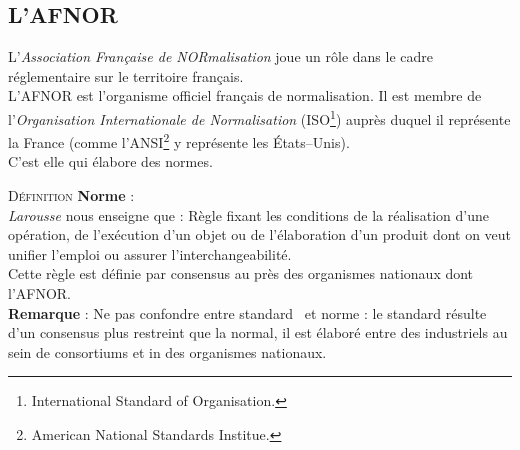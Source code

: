 \documentclass[a4paper,11pt]{article}
\newcounter{defi}
\newcommand{\defi}[1]{\addtocounter{defi}{1}%
  \noindent\textsc{Définition \thedefi } \textbf{#1} :\\ }
\newcommand{\rem}{\noindent\textbf{Remarque} : }
\begin{document}
\begin{sloppypar}
\subsection{L'AFNOR}
L'\emph{Association Française de NORmalisation} joue un rôle dans le cadre réglementaire sur le territoire français.\\
L'AFNOR est l'organisme officiel français de normalisation. Il est membre de l'\emph{Organisation Internationale de Normalisation} 
(ISO\footnote{International Standard of Organisation.}) auprès duquel il représente la France (comme l'ANSI\footnote{American National Standards Institue.} y représente les \'Etats--Unis).\\
C'est elle qui élabore des normes.\\

\defi{Norme}
\emph{Larousse} nous enseigne que : Règle fixant les conditions de la réalisation d'une opération, de l'exécution d'un objet ou de 
l'élaboration d'un produit dont on veut unifier l'emploi ou assurer l'interchangeabilité.\\
Cette règle est définie par consensus au près des organismes nationaux dont l'AFNOR.\\

\rem Ne pas confondre entre \og standard \fg\, et \og norme \fg : le standard résulte d'un consensus plus restreint que la normal, il est élaboré entre des industriels au sein
de consortiums et in des organismes nationaux.\\


\end{sloppypar}
\end{document}
